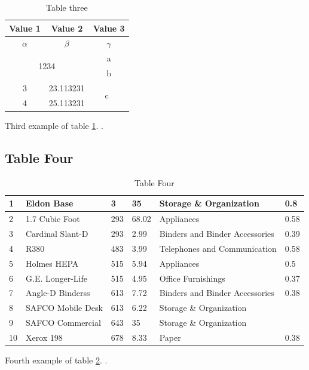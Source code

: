 \begin{table}[!ht]
  \centering
  \label{tab:table3}
  \begin{tabular}{|c|c|c|}
    \hline
    \textbf{Value 1}                            & \textbf{Value 2} & \textbf{Value 3}    \\
    \hline
    $\alpha$                                    & $\beta$          & $\gamma$            \\
    \hline
    \multicolumn{2}{|c|}{\multirow{2}{*}{1234}} & a                                      \\
    \cline{3-3}
    \multicolumn{2}{|c|}{}                      & b                                      \\
    \hline
    3                                           & 23.113231        & \multirow{2}{*}{c~} \\
    \cline{1-2}
    4                                           & 25.113231        &                     \\
    \hline
  \end{tabular}
  \caption{Table three}
  \label{Tab:tablethree}
\end{table}
Third example of table \ref{Tab:tablethree}.
\lipsum[1-1].
\subsection{Table Four}
\begin{table}[!ht]
  \centering
  \begin{tabular}{|l|l|l|l|l|l|}
    \hline
    1  & Eldon Base        & 3   & 35    & Storage \& Organization        & 0.8  \\ \hline
    2  & 1.7 Cubic Foot    & 293 & 68.02 & Appliances                     & 0.58 \\ \hline
    3  & Cardinal Slant-D  & 293 & 2.99  & Binders and Binder Accessories & 0.39 \\ \hline
    4  & R380              & 483 & 3.99  & Telephones and Communication   & 0.58 \\ \hline
    5  & Holmes HEPA       & 515 & 5.94  & Appliances                     & 0.5  \\ \hline
    6  & G.E. Longer-Life  & 515 & 4.95  & Office Furnishings             & 0.37 \\ \hline
    7  & Angle-D Binderss  & 613 & 7.72  & Binders and Binder Accessories & 0.38 \\ \hline
    8  & SAFCO Mobile Desk & 613 & 6.22  & Storage \& Organization        & ~    \\ \hline
    9  & SAFCO Commercial  & 643 & 35    & Storage \& Organization        & ~    \\ \hline
    10 & Xerox 198         & 678 & 8.33  & Paper                          & 0.38 \\ \hline
  \end{tabular}
  \caption{Table Four}
  \label{Tab:tablefour}
\end{table}
Fourth example of table \ref{Tab:tablefour}.
\lipsum[1-1].
